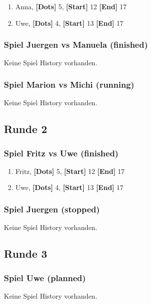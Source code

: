 \documentclass{article}
\begin{document}
  \begin{enumerate}
        
    \item Anna,
      \textbf{[Dots]} 5,
      \textbf{[Start]} 12
      \textbf{[End]} 17
    \item Uwe,
      \textbf{[Dots]} 4,
      \textbf{[Start]} 13
      \textbf{[End]} 17
  \end{enumerate}
      
    \subsubsection*{Spiel Juergen vs Manuela (finished)}
    
        Keine Spiel History vorhanden.
      
    \subsubsection*{Spiel Marion vs Michi (running)}
    
        Keine Spiel History vorhanden.
      
    \subsection{Runde 2}
    
    \subsubsection*{Spiel Fritz vs Uwe (finished)}
    
  \begin{enumerate}
        
    \item Fritz,
      \textbf{[Dots]} 5,
      \textbf{[Start]} 12
      \textbf{[End]} 17
    \item Uwe,
      \textbf{[Dots]} 4,
      \textbf{[Start]} 13
      \textbf{[End]} 17
  \end{enumerate}
      
    \subsubsection*{Spiel Juergen (stopped)}
    
        Keine Spiel History vorhanden.
      
    \subsection{Runde 3}
    
    \subsubsection*{Spiel Uwe (planned)}
    
        Keine Spiel History vorhanden.
      
\end{document}
